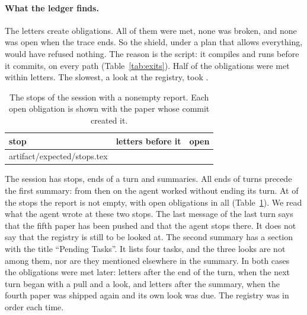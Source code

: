 \documentclass[acmsmall,nonacm,screen]{acmart}
\makeatletter
\newcommand{\claim}[2]{#2}
\newcommand{\rows}[1]{\@@input artifact/expected/#1.tex }
\makeatother
\begin{document}
\paragraph{What the ledger finds.} The letters create \exSessionObligations{} obligations.
\claim{session-all-met}{All of them were met, none was broken, and none was open when the
trace ends.} So the shield, under a plan that allows everything, would have refused nothing.
The reason is the script: it compiles and runs before it commits, on every path
(Table~\ref{tab:exits}). Half of the obligations were met within \exSessionHalf{} letters.
The slowest, a look at the registry, took \exSessionSlowest{}.

\begin{table}
\caption{The stops of the session with a nonempty report. Each open obligation is shown
with the paper whose commit created it.}
\label{tab:stops}
\begin{tabular}{lrl}
\toprule
stop & letters before it & open \\
\midrule
\rows{stops}
\bottomrule
\end{tabular}
\end{table}

The session has \exSessionStops{} stops, \exSessionEnds{} ends of a turn and
\exSessionSummaries{} summaries. \claim{no-end-later}{All ends of turns precede the first
summary}: from then on the agent worked without ending its turn. \claim{session-two-stops}{At \exSessionWithReport{} of the stops the report is
not empty}, with \exSessionLeft{} open obligations in all (Table~\ref{tab:stops}). We read
what the agent wrote at these two stops. The last message of the last turn says that the fifth
paper has been pushed and that the agent stops there. It does not say that the registry is
still to be looked at. The second summary has a section with the title ``Pending Tasks''.
It lists four tasks, and the three looks are not among them, nor are they mentioned
elsewhere in the summary. In both cases the obligations were met later: \exSessionWaitEnd{}
letters after the end of the turn, when the next turn began with a pull and a look, and
\exSessionWaitSummary{} letters after the summary, when the fourth paper was shipped again
and its own look was due. The registry was in order each time.
\end{document}
